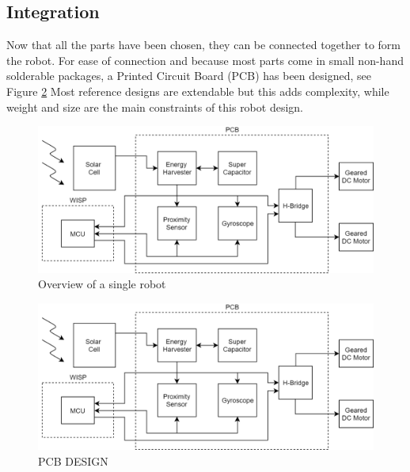 \subsection{Integration}


Now that all the parts have been chosen, they can be connected together to form the robot.
For ease of connection and because most parts come in small non-hand solderable packages, a Printed Circuit Board (PCB) has been designed, see Figure \ref{fig:pcb_robot}
Most reference designs are extendable but this adds complexity, while weight and size are the main constraints of this robot design.



\begin{figure}
	\centering
	\includegraphics[width=\textwidth]{pics/schematic_robot_v2.png}
	\caption{Overview of a single robot}
	\label{fig:system_overview}
\end{figure}


\begin{figure}
	\centering
	\includegraphics[width=\textwidth]{pics/schematic_robot_v2.png}
	\caption{PCB DESIGN}
	\label{fig:pcb_robot}
\end{figure}


